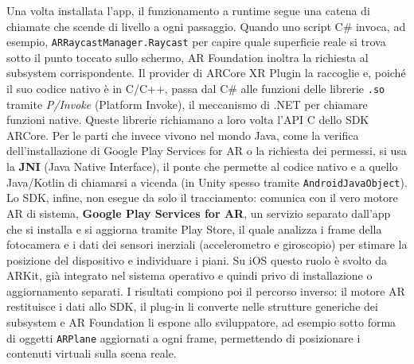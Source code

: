 Una volta installata l'app, il funzionamento a runtime segue una catena di chiamate che scende di livello a ogni passaggio. Quando uno script C\# invoca, ad esempio, \texttt{ARRaycastManager.Raycast} per capire quale superficie reale si trova sotto il punto toccato sullo schermo, AR Foundation inoltra la richiesta al subsystem corrispondente. Il provider di ARCore XR Plugin la raccoglie e, poiché il suo codice nativo è in C/C++, passa dal C\# alle funzioni delle librerie \texttt{.so} tramite \textit{P/Invoke} (Platform Invoke), il meccanismo di .NET per chiamare funzioni native. Queste librerie richiamano a loro volta l'API C dello SDK ARCore. Per le parti che invece vivono nel mondo Java, come la verifica dell'installazione di Google Play Services for AR o la richiesta dei permessi, si usa la \textbf{JNI} (Java Native Interface), il ponte che permette al codice nativo e a quello Java/Kotlin di chiamarsi a vicenda (in Unity spesso tramite \texttt{AndroidJavaObject}). Lo SDK, infine, non esegue da solo il tracciamento: comunica con il vero motore AR di sistema, \textbf{Google Play Services for AR}, un servizio separato dall'app che si installa e si aggiorna tramite Play Store, il quale analizza i frame della fotocamera e i dati dei sensori inerziali (accelerometro e giroscopio) per stimare la posizione del dispositivo e individuare i piani. Su iOS questo ruolo è svolto da ARKit, già integrato nel sistema operativo e quindi privo di installazione o aggiornamento separati. I risultati compiono poi il percorso inverso: il motore AR restituisce i dati allo SDK, il plug-in li converte nelle strutture generiche dei subsystem e AR Foundation li espone allo sviluppatore, ad esempio sotto forma di oggetti \texttt{ARPlane} aggiornati a ogni frame, permettendo di posizionare i contenuti virtuali sulla scena reale.



